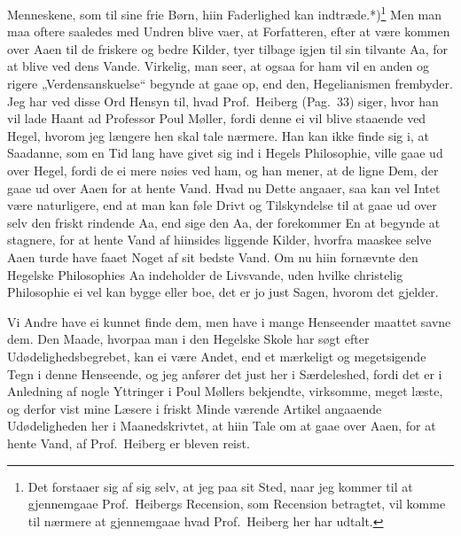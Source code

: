 \documentclass[12pt,a4paper]{book}
\newcommand{\apage}[1]{\marginnote{\footnotesize\textit{[#1]}}}
\begin{document}
Menneskene, som til sine frie Børn, hiin Faderlighed kan
indtræde.*)\footnote{Det forstaaer sig af sig selv, at jeg paa sit Sted,
naar jeg kommer til at gjennemgaae Prof.\ Heibergs Recension, som
Recension betragtet, vil komme til nærmere at gjennemgaae hvad Prof.\
Heiberg her har udtalt.} Men man maa oftere saaledes med Undren blive vaer,
at Forfatteren, efter at være kommen over Aaen til de friskere og bedre
Kilder, tyer tilbage igjen til sin tilvante Aa, for at blive ved dens
Vande. Virkelig, man seer, at ogsaa for ham vil en anden og rigere
„Verdensanskuelse“ begynde at gaae op, end den, Hegelianismen frembyder.
Jeg har ved disse Ord Hensyn til, hvad Prof.\ Heiberg (Pag.\ 33) siger,
hvor han vil lade Haant ad Professor Poul Møller, fordi denne ei vil blive
staaende ved Hegel, hvorom jeg længere hen skal tale nærmere. Han kan ikke
finde sig i, at Saadanne, som en Tid lang have givet sig ind i Hegels
Philosophie, ville gaae ud over Hegel, fordi de ei mere nøies ved ham, og
han mener, at de ligne Dem, der gaae ud over Aaen for at hente Vand. Hvad
nu Dette angaaer, saa kan vel Intet være naturligere, end at man kan føle
Drivt og Tilskyndelse til at gaae ud over selv den friskt rindende Aa, end
sige den Aa, der forekommer En at begynde at stagnere, for at hente Vand af
hiinsides liggende Kilder, hvorfra maaskee selve Aaen turde have faaet
Noget af sit bedste Vand. Om nu hiin fornævnte den Hegelske Philosophies Aa
indeholder de Livsvande, uden hvilke christelig Philosophie ei vel kan
bygge eller boe, det er jo just Sagen, hvorom det gjelder.
%
\apage{12} Vi Andre have ei kunnet finde dem, men have i mange Henseender maattet
savne dem. Den Maade, hvorpaa man i den Hegelske Skole har søgt efter
Udødelighedsbegrebet, kan ei være Andet, end et mærkeligt og megetsigende
Tegn i denne Henseende, og jeg anfører det just her i Særdeleshed, fordi
det er i Anledning af nogle Yttringer i Poul Møllers bekjendte, virksomme,
meget læste, og derfor vist mine Læsere i friskt Minde værende Artikel
angaaende Udødeligheden her i Maanedskrivtet, at hiin Tale om at gaae over
Aaen, for at hente Vand, af Prof.\ Heiberg er bleven reist.
\end{document}
